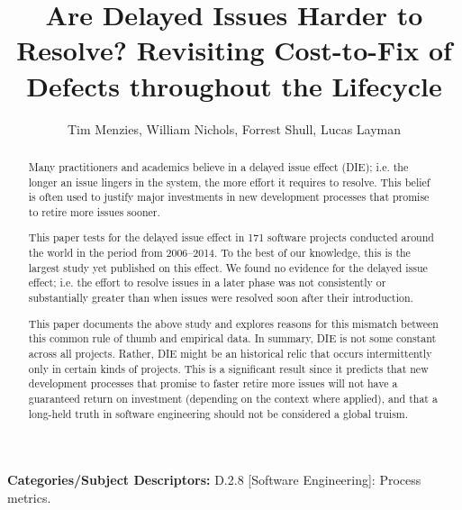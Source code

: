 \documentclass[smallcondensed]{svjour3}
\begin{document}
\date{}
 \title{Are Delayed Issues Harder to Resolve? Revisiting Cost-to-Fix of Defects throughout the Lifecycle}
 
 \author{Tim Menzies, William Nichols, Forrest Shull, Lucas Layman}
 
\maketitle
\begin{abstract}
Many  practitioners and academics
believe in a delayed issue effect (DIE); i.e.
 the longer an issue lingers in the system, the more effort it requires to resolve.
This belief
is often  used to justify 
major investments in  new development
processes that promise to retire more issues sooner.

This paper tests for the delayed issue effect in
171 software projects conducted around the world in the period from 2006--2014.
To the best of our knowledge,  this is the largest study
yet published on this effect.
We found no evidence for the  delayed issue effect; i.e.
the  effort  to resolve 
issues in a later phase was not consistently or substantially greater than  
when  issues were resolved soon after their introduction. 

This paper documents the above study and explores reasons for this  mismatch between this common rule of thumb and empirical data.
In  summary, DIE is not some constant across all projects. Rather, DIE might
be an historical relic that  occurs intermittently 
only in  certain kinds of projects.  This is a significant result since it predicts that  new development
processes that promise to faster retire more issues will not have a guaranteed return on investment (depending on the context where applied), and that a long-held truth in software engineering should not be considered a global truism. 
\end{abstract}

 \vspace{1mm}
\noindent
{\bf Categories/Subject Descriptors:} 
D.2.8 [Software Engineering]: Process metrics.
\end{document}
